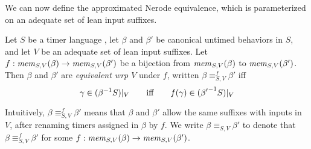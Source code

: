 




We can now define the approximated Nerode equivalence, which is parameterized
on an adequate set of lean input suffixes.

\begin{definition}
  \label{def:approx-nerode}
Let $S$ be a timer language ,
let $\beta$ and $\beta'$ be canonical untimed behaviors in $S$,
and let  $V$ be an adequate set of lean input suffixes.
Let $f : \apprgetmemorable{S}{\beta}{V} \to \apprgetmemorable{S}{\beta'}{V}$
be a bijection
from $\apprgetmemorable{S}{\beta}{V}$ to $\apprgetmemorable{S}{\beta'}{V}$.
Then $\beta$ and $\beta'$ are \emph{equivalent wrp $V$} under $f$, written
$\beta \equiv_{S,V}^f \beta'$ iff
\[
\gamma \in \apprsuffixbehs{S}{\beta}{V}
\qquad \mbox{iff} \qquad
f(\gamma) \in \apprsuffixbehs{S}{\beta'}{V}
\]
\end{definition}
Intuitively, $\beta \equiv_{S,V}^f \beta'$ means that $\beta$ and $\beta'$
allow the same suffixes with inputs in $V$, after renaming
timers assigned in $\beta$ by $f$.
We write $\beta \equiv_{S,V} \beta'$ to denote that
$\beta \equiv_{S,V}^f \beta'$ for some
$f : \apprgetmemorable{S}{\beta}{V} \to \apprgetmemorable{S}{\beta'}{V}$.





